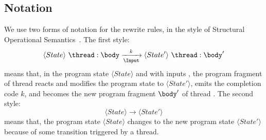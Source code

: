 



\subsection{Notation}
We use two forms of notation for the rewrite rules, in 
the style of Structural Operational Semantics~\cite{semantics_sos}.
The first style:
\begin{equation*}
	\langle State \rangle ~ \thread:\body 
		\xrightarrow[\Input]{~~k~~} 
	\langle State' \rangle ~ \thread:\body'
\end{equation*}
means that, in the program state $\langle State \rangle$ and with inputs \Input{}, 
the program fragment \body{} of thread \thread{} reacts 
and modifies the program state to $\langle State' \rangle$, emits the 
completion code $k$, and becomes the new program fragment 
$\body'$ of thread \thread{}. The second style:
\begin{equation*}
	\langle State \rangle
		\xrightarrow{~~~~~} 
	\langle State' \rangle
\end{equation*}
means that, the program state $\langle State \rangle$ changes to 
the new program state $\langle State' \rangle$ because of some 
transition triggered by a thread.

